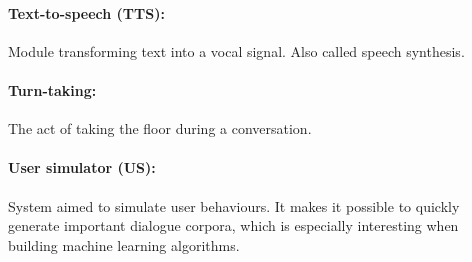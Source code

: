\paragraph{Text-to-speech (TTS):} Module transforming text into a vocal signal. Also called speech synthesis.

\paragraph{Turn-taking:} The act of taking the floor during a conversation.

\paragraph{User simulator (US):} System aimed to simulate user behaviours. It makes it possible to quickly generate important dialogue corpora, which is especially interesting when building machine learning algorithms.

